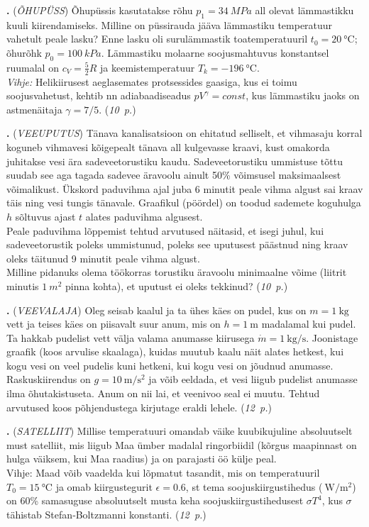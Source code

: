 \documentclass[11pt,a5paper]{article}
\newcommand{\numb}[1]{\vspace{5pt}\textbf{\large #1}}
\newcommand{\nimi}[1]{(\textsl{\small #1})}
\newcommand{\punktid}[1]{(\emph{#1~p.})}
\newcounter{ylesanne}
\newcommand{\yl}[1]{\addtocounter{ylesanne}{1}\numb{\theylesanne.} \nimi{#1} \newblock{}}
\newcommand{\autor}[1]{}%
\begin{document}
\yl{ÕHUPÜSS}
Õhupüssis kasutatakse rõhu $p_1=\SI{34}{MPa}$ all olevat lämmastikku kuuli kiirendamiseks. Milline on püssirauda jääva lämmastiku temperatuur vahetult peale lasku? Enne lasku oli surulämmastik toatemperatuuril $t_0=\SI{20}\celsius$; õhurõhk $p_0=\SI{100}{kPa}$. Lämmastiku molaarne soojusmahtuvus konstantsel ruumalal on $c_V=\frac 52R$ ja keemistemperatuur $T_k=\SI{-196}\celsius$. \\
\textit{Vihje:} Helikiirusest aeglasemates protsessides gaasiga, kus ei toimu soojusvahetust, kehtib nn adiabaadiseadus $pV^\gamma=const$, kus lämmastiku jaoks on astmenäitaja $\gamma=7/5$. 
\punktid{10} \autor{Jaan Kalda}

\yl{VEEUPUTUS}
Tänava kanalisatsioon on ehitatud selliselt, et vihmasaju korral koguneb vihmavesi kõigepealt tänava all kulgevasse kraavi, kust omakorda juhitakse vesi ära sadeveetorustiku kaudu. Sadeveetorustiku ummistuse tõttu suudab see aga tagada sadevee äravoolu ainult 50\% võimsusel maksimaalsest võimalikust. Ükskord paduvihma ajal juba 6 minutit peale vihma algust sai kraav täis ning vesi tungis tänavale. Graafikul (pöördel) on toodud sademete koguhulga $h$ sõltuvus ajast $t$ alates paduvihma algusest. \\
Peale paduvihma lõppemist tehtud arvutused näitasid, et isegi juhul, kui sadeveetorustik poleks ummistunud, poleks see uputusest päästnud ning kraav oleks täitunud 9 minutit peale vihma algust.\\
Milline pidanuks olema töökorras torustiku äravoolu minimaalne võime (liitrit minutis $\SI{1} {m^2}$ pinna kohta), et uputust ei oleks tekkinud? \punktid{10} \autor{Oleg Ko\v sik}

\yl{VEEVALAJA}
Oleg seisab kaalul ja ta ühes käes on pudel, kus on $m=\SI{1}{\kilogram}$ vett ja teises käes on piisavalt suur anum, mis on $h=\SI{1}{\meter}$ madalamal kui pudel. Ta hakkab pudelist vett välja valama anumasse kiirusega $\dot{m}=\SI{1}{\kilo\gram / \second}$.
Joonistage graafik (koos arvulise skaalaga), kuidas muutub kaalu näit alates hetkest, kui kogu vesi on veel pudelis kuni hetkeni, kui kogu vesi on jõudnud anumasse. Raskuskiirendus on $g=\SI{10}{\meter / \second\squared}$ ja võib eeldada, et vesi liigub pudelist anumasse ilma õhutakistuseta. Anum on nii lai, et veenivoo seal ei muutu. Tehtud arvutused koos põhjendustega kirjutage eraldi lehele.
\punktid{12} \autor{Kaur Aare Saar}

\newpage

\yl{SATELLIIT}
Millise temperatuuri omandab väike kuubikujuline absoluutselt must satelliit, mis liigub Maa ümber madalal ringorbiidil (kõrgus maapinnast on hulga väiksem, kui Maa raadius) ja on parajasti öö külje peal. \\
Vihje: Maad võib vaadelda kui lõpmatut tasandit, mis on temperatuuril $T_0=\SI{15}\celsius$ ja omab kiirgustegurit $\epsilon=\num{0.6}$, st tema soojuskiirgustihedus ($\SI{}{\watt / \metre\squared}$) on 60\% samasuguse absoluutselt musta keha soojuskiirgustihedusest $\sigma T^4$, kus $\sigma$ tähistab Stefan‐Boltzmanni konstanti.
\punktid{12} \autor{Jaan Kalda}
\end{document}
